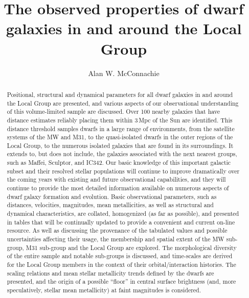 \documentclass[manuscript]{aastex}
\begin{document}
\title{The observed properties of dwarf galaxies in and around the Local Group}

\author{Alan W. McConnachie}

\clearpage
\newpage

\begin{abstract}
  Positional, structural and dynamical parameters for all dwarf
  galaxies in and around the Local Group are presented, and various
  aspects of our observational understanding of this volume-limited
  sample are discussed. Over 100 nearby galaxies that have distance
  estimates reliably placing them within 3\,Mpc of the Sun are
  identified. This distance threshold samples dwarfs in a large range
  of environments, from the satellite systems of the MW and M31, to
  the quasi-isolated dwarfs in the outer regions of the Local Group,
  to the numerous isolated galaxies that are found in its
  surroundings. It extends to, but does not include, the galaxies
  associated with the next nearest groups, such as Maffei, Sculptor,
  and IC342. Our basic knowledge of this important galactic subset and
  their resolved stellar populations will continue to improve
  dramatically over the coming years with existing and future
  observational capabilities, and they will continue to provide the
  most detailed information available on numerous aspects of dwarf
  galaxy formation and evolution. Basic observational parameters, such
  as distances, velocities, magnitudes, mean metallicities, as well as
  structural and dynamical characteristics, are collated, homogenized
  (as far as possible), and presented in tables that will be
  continually updated to provide a convenient and current on-line
  resource. As well as discussing the provenance of the tabulated
  values and possible uncertainties affecting their usage, the
  membership and spatial extent of the MW sub-group, M31 sub-group and
  the Local Group are explored. The morphological diversity of the
  entire sample and notable sub-groups is discussed, and time-scales
  are derived for the Local Group members in the context of their
  orbital/interaction histories. The scaling relations and mean
  stellar metallicity trends defined by the dwarfs are presented, and
  the origin of a possible ``floor'' in central surface brightness (and, more
  speculatively, stellar mean metallicity) at faint magnitudes is considered.
\end{abstract}
\end{document}
